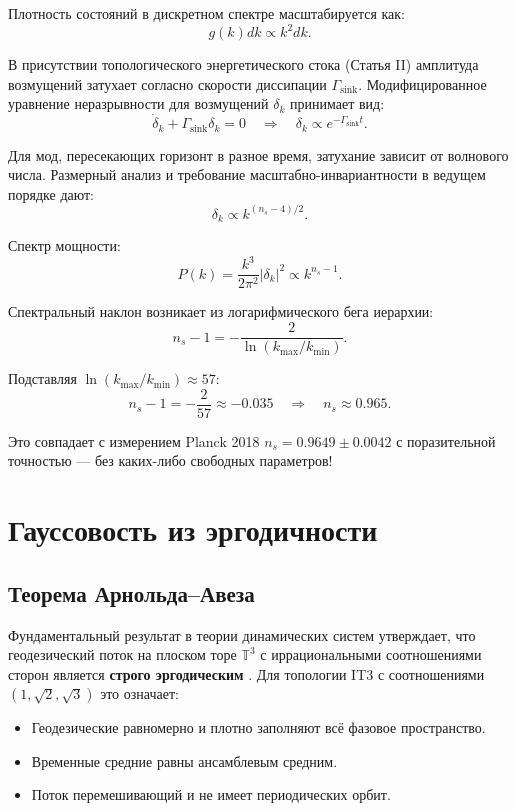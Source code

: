 \documentclass[12pt,a4paper]{article}
\begin{document}
Плотность состояний в дискретном спектре масштабируется как:
\begin{equation}
g(k) dk \propto k^2 dk.
\end{equation}

В присутствии топологического энергетического стока (Статья II) амплитуда возмущений затухает согласно скорости диссипации $\Gamma_{\mathrm{sink}}$. Модифицированное уравнение неразрывности для возмущений $\delta_k$ принимает вид:
\begin{equation}
\dot{\delta}_k + \Gamma_{\mathrm{sink}} \delta_k = 0 \quad \Rightarrow \quad \delta_k \propto e^{-\Gamma_{\mathrm{sink}} t}.
\end{equation}

Для мод, пересекающих горизонт в разное время, затухание зависит от волнового числа. Размерный анализ и требование масштабно-инвариантности в ведущем порядке дают:
\begin{equation}
\delta_k \propto k^{(n_s - 4)/2}.
\end{equation}

Спектр мощности:
\begin{equation}
P(k) = \frac{k^3}{2\pi^2} |\delta_k|^2 \propto k^{n_s - 1}.
\end{equation}

Спектральный наклон возникает из логарифмического бега иерархии:
\begin{equation}
n_s - 1 = -\frac{2}{\ln(k_{\max}/k_{\min})}.
\label{eq:ns}
\end{equation}

Подставляя $\ln(k_{\max}/k_{\min}) \approx 57$:
\begin{equation}
n_s - 1 = -\frac{2}{57} \approx -0.035 \quad \Rightarrow \quad n_s \approx 0.965.
\end{equation}

Это совпадает с измерением Planck 2018 $n_s = 0.9649 \pm 0.0042$ \citep{Planck2020} с поразительной точностью — без каких-либо свободных параметров!

\section{Гауссовость из эргодичности}

\subsection{Теорема Арнольда–Авеза}

Фундаментальный результат в теории динамических систем утверждает, что геодезический поток на плоском торе $\mathbb{T}^3$ с иррациональными соотношениями сторон является \textbf{строго эргодическим} \citep{Arnold1968}. Для топологии IT3 с соотношениями $(1, \sqrt{2}, \sqrt{3})$ это означает:
\begin{itemize}
    \item Геодезические равномерно и плотно заполняют всё фазовое пространство.
    \item Временные средние равны ансамблевым средним.
    \item Поток перемешивающий и не имеет периодических орбит.
\end{itemize}
\end{document}
